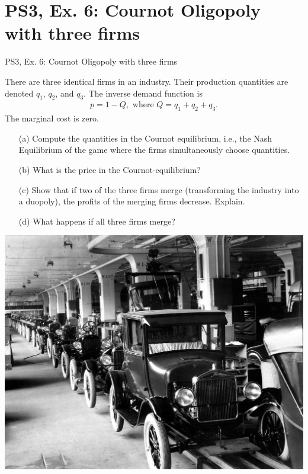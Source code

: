 \section{PS3, Ex. 6: Cournot Oligopoly with three firms}

\begin{frame}{PS3, Ex. 6: Cournot Oligopoly with three firms}
  \begin{multicols}{2}
    There are three identical firms in an industry. Their production quantities are denoted $q_1$, $q_2$, and $q_3$. The inverse demand function is
    \begin{align*}
      p=1-Q,\text{     where }Q=q_1+q_2+q_3.
    \end{align*}
    The marginal cost is zero.
    \begin{itemize}
      \item[(a)] Compute the quantities in the Cournot equilibrium, i.e., the Nash Equilibrium of the game where the firms simultaneously choose quantities.
      \item[(b)] What is the price in the Cournot-equilibrium?
      \item[(c)] Show that if two of the three firms merge (transforming the industry into a duopoly), the profits of the merging firms decrease. Explain.
      \item[(d)] What happens if all three firms merge?
    \end{itemize}
  \vfill\null \columnbreak
    \includegraphics[width=.5 \textwidth]{figures/ford}
  \vfill\null
  \end{multicols}
\end{frame}


